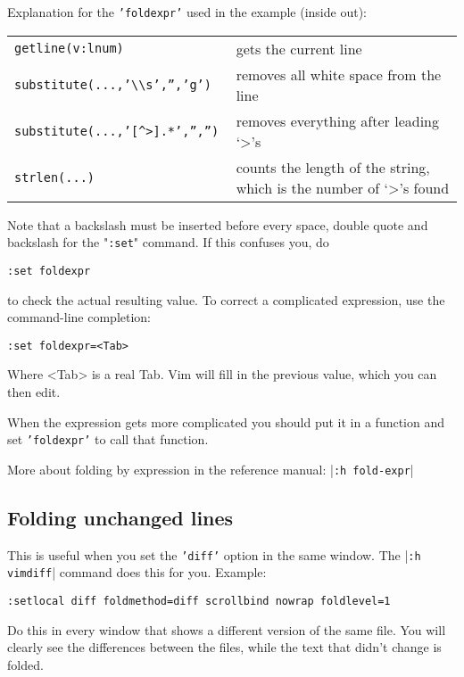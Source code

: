 Explanation for the \texttt{'foldexpr'} used in the example (inside out):
\begin{center} \begin{tabular}{l l}
				\texttt{getline(v:lnum) } & gets the current line \\
				\texttt{substitute(...,'\textbackslash{}\textbackslash{}s','','g') } & removes all white space from the line \\
				\texttt{substitute(...,'[\^{}>].*','','') } & removes everything after leading `>'s \\
				\texttt{strlen(...) } & counts the length of the string, which is the number of `>'s found \\
\end{tabular} \end{center}
Note that a backslash must be inserted before every space, double quote and backslash for the "\texttt{:set}" command.
If this confuses you, do

\begin{Verbatim}[samepage=true]
 :set foldexpr
\end{Verbatim}

to check the actual resulting value.
To correct a complicated expression, use the command-line completion:

\begin{Verbatim}[samepage=true]
 :set foldexpr=<Tab>
\end{Verbatim}

Where <Tab> is a real Tab.
Vim will fill in the previous value, which you can then edit.

When the expression gets more complicated you should put it in a function and set \texttt{'foldexpr'} to call that function.

More about folding by expression in the reference manual: |\texttt{:h fold-expr}|
\subsection{Folding unchanged lines}
This is useful when you set the \texttt{'diff'} option in the same window.
The |\texttt{:h vimdiff}| command does this for you.
Example:

\begin{Verbatim}[samepage=true]
 :setlocal diff foldmethod=diff scrollbind nowrap foldlevel=1
\end{Verbatim}

Do this in every window that shows a different version of the same file.
You will clearly see the differences between the files, while the text that didn't change is folded.


